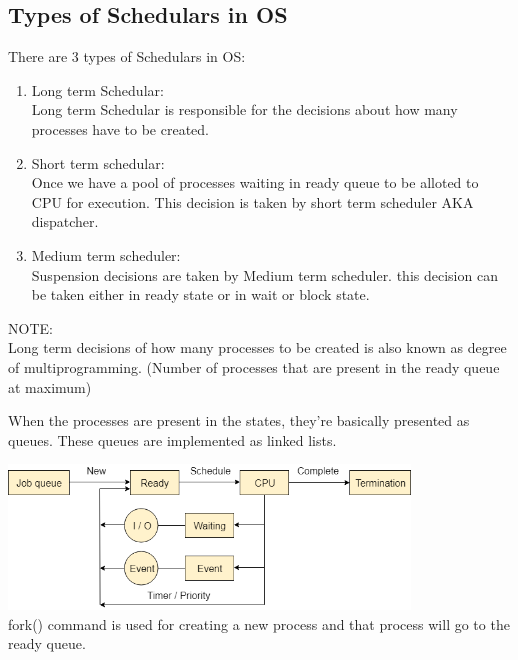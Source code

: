 \documentclass[12pt,letterpaper]{article}
\begin{document}
\subsection{Types of Schedulars in OS}
There are 3 types of Schedulars in OS: 
\begin{enumerate}
  \item Long term Schedular:\\ Long term Schedular is responsible for the decisions about how many processes have to be created. 
  \item Short term schedular:\\ Once we have a pool of processes waiting in ready queue to be alloted to CPU for execution. This decision is taken by short term scheduler AKA dispatcher.
  \item Medium term scheduler:\\ Suspension decisions are taken by Medium term scheduler. this decision can be taken either in ready state or in wait or block state. 
\end{enumerate}

NOTE:\\
Long term decisions of how many processes to be created is also known as degree of multiprogramming. (Number of processes that are present in the ready queue at maximum)

When the processes are present in the states, they're basically presented as queues. These queues are implemented as linked lists. 
\vspace{1cm}

\includegraphics[width=0.8\textwidth]{Imports/ProcessQueue.png}\\
fork() command is used for creating a new process and that process will go to the ready queue. 
\end{document}
